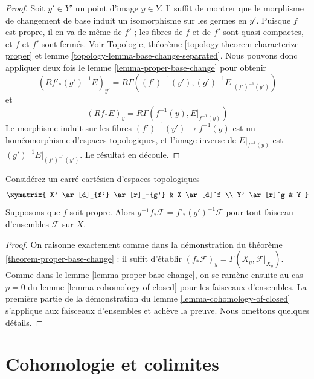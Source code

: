 \begin{proof}

Soit $y' \in Y'$ un point d'image $y \in Y$. Il suffit de montrer que le morphisme de changement de base induit un isomorphisme sur les germes en $y'$. Puisque $f$ est propre, il en va de même de $f'$ ; les fibres de $f$ et de $f'$ sont quasi-compactes, et $f$ et $f'$ sont fermés. Voir Topologie, théorème \ref{topology-theorem-characterize-proper} et lemme \ref{topology-lemma-base-change-separated}. Nous pouvons donc appliquer deux fois le lemme \ref{lemma-proper-base-change} pour obtenir
$$
(Rf'_*(g')^{-1}E)_{y'} = R\Gamma((f')^{-1}(y'), (g')^{-1}E|_{(f')^{-1}(y')})
$$
et
$$
(Rf_*E)_y = R\Gamma(f^{-1}(y), E|_{f^{-1}(y)})
$$
Le morphisme induit sur les fibres $(f')^{-1}(y') \to f^{-1}(y)$ est un homéomorphisme d'espaces topologiques, et l'image inverse de
$E|_{f^{-1}(y)}$ est $(g')^{-1}E|_{(f')^{-1}(y')}$. Le résultat en découle.

\end{proof}

\begin{lemma}
\label{lemma-proper-base-change-sheaves-of-sets}
Considérez un carré cartésien d'espaces topologiques $$
\xymatrix{
X' \ar[d]_{f'} \ar[r]_-{g'} & X \ar[d]^f \\
Y' \ar[r]^g & Y
}
$$ Supposons que $f$ soit propre. Alors $g^{-1}f_*\mathcal{F} = f'_*(g')^{-1}\mathcal{F}$ pour tout faisceau d'ensembles $\mathcal{F}$ sur $X$.
\end{lemma}

\begin{proof}
On raisonne exactement comme dans la démonstration du théorème \ref{theorem-proper-base-change} : il suffit d'établir $(f_*\mathcal{F})_y = \Gamma(X_y, \mathcal{F}|_{X_y})$. Comme dans le lemme \ref{lemma-proper-base-change}, on se ramène ensuite au cas $p = 0$ du lemme \ref{lemma-cohomology-of-closed} pour les faisceaux d'ensembles. La première partie de la démonstration du lemme \ref{lemma-cohomology-of-closed} s'applique aux faisceaux d'ensembles et achève la preuve. Nous omettons quelques détails.
\end{proof}



\section{Cohomologie et colimites}

\label{section-limits}

